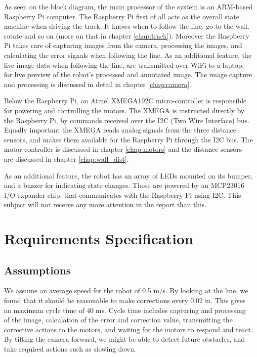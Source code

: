 As seen on the block diagram, the main processor of the system is an ARM-based Raspberry Pi computer. The Raspberry Pi first of all acts as the overall state machine when driving the track. It knows when to follow the line, go to the wall, rotate and so on (more on that in chapter \ref{chap:track}). Moreover the Raspberry Pi takes care of capturing images from the camera, processing the images, and calculating the error signals when following the line. As an additional feature, the live image data when following the line, are transmitted over WiFi to a laptop, for live preview of the robot's processed and annotated image. The image capture and processing is discussed in detail in chapter \ref{chap:camera}. 

Below the Raspberry Pi, an Atmel XMEGA192C micro-controller is responsible for powering and controlling the motors. The XMEGA is instructed directly by the Raspberry Pi, by commands received over the I2C (Two Wire Interface) bus. Equally important the XMEGA reads analog signals from the three distance sensors, and makes them available for the Raspberry Pi through the I2C bus. The motor-controller is discussed in chapter \ref{chap:motors} and the distance sensors are discussed in chapter \ref{chap:wall_dist}.

As an additional feature, the robot has an array of LEDs mounted on its bumper, and a buzzer for indicating state changes. Those are powered by an MCP23016 I/O expander chip, that communicates with the Raspberry Pi using I2C. This subject will not receive any more attention in the report than this.

%
%
%
%
\section{Requirements Specification}
\subsection{Assumptions}

We assume an average speed for the robot of 0.5 m/s. By looking at the line, we found that it should be
reasonable to make corrections every 0.02 m. This gives an maximum cycle time of 40 ms. Cycle
time includes capturing and processing of the image, calculation of the error and correction value,
transmitting the corrective actions to the motors, and waiting for the motors to respond and react.
By tilting the camera forward, we might be able to detect future obstacles, and take required actions
such as slowing down.


